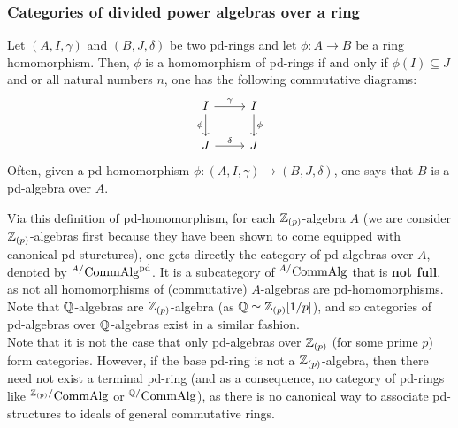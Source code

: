             \subsubsection{Categories of divided power algebras over a ring}
                \begin{definition}[pd-homomorphisms] \label{def: PD_homomorphisms}
                    Let $(A, I , \gamma)$ and $(B, J, \delta)$ be two pd-rings and let $\phi: A \to B$ be a ring homomorphism. Then, $\phi$ is a homomorphism of pd-rings if and only if $\phi(I) \subseteq J$ and or all natural numbers $n$, one has the following commutative diagrams:
                        $$
                            \begin{tikzcd}
                            	{I} & {I} \\
                            	{J} & {J}
                            	\arrow["{\phi}"', from=1-1, to=2-1]
                            	\arrow["{\phi}", from=1-2, to=2-2]
                            	\arrow["{\delta}", from=2-1, to=2-2]
                            	\arrow["{\gamma}", from=1-1, to=1-2]
                            \end{tikzcd}
                        $$
                    Often, given a pd-homomorphism $\phi: (A, I, \gamma) \to (B, J, \delta)$, one says that $B$ is a pd-algebra over $A$. 
                \end{definition}
                \begin{remark}
                    Via this definition of pd-homomorphism, for each $\mathbb{Z}_{(p)}$-algebra $A$ (we are consider $\mathbb{Z}_{(p)}$-algebras first because they have been shown to come equipped with canonical pd-sturctures), one gets directly the category of pd-algebras over $A$, denoted by ${}^{A/}\mathrm{Comm}\mathrm{Alg}^{\mathrm{pd}}$. It is a subcategory of ${}^{A/}\mathrm{Comm}\mathrm{Alg}$ that is \textbf{not full}, as not all homomorphisms of (commutative) $A$-algebras are pd-homomorphisms. Note that $\mathbb{Q}$-algebras are $\mathbb{Z}_{(p)}$-algebra (as $\mathbb{Q} \simeq \mathbb{Z}_{(p)}[1/p]$), and so categories of pd-algebras over $\mathbb{Q}$-algebras exist in a similar fashion.
                    \\
                    Note that it is not the case that only pd-algebras over $\mathbb{Z}_{(p)}$ (for some prime $p$) form categories. However, if the base pd-ring is not a $\mathbb{Z}_{(p)}$-algebra, then there need not exist a terminal pd-ring (and as a consequence, no  category of pd-rings like ${}^{\mathbb{Z}_{(p)}/}\mathrm{Comm}\mathrm{Alg}$ or ${}^{\mathbb{Q}/}\mathrm{Comm}\mathrm{Alg}$), as there is no canonical way to associate pd-structures to ideals of general commutative rings.  
                \end{remark}
                
